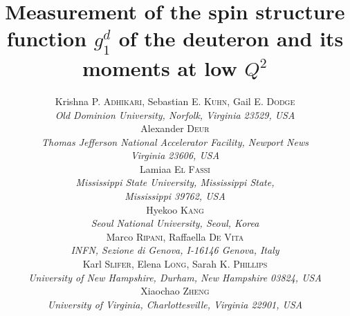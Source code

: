 \documentclass[a4paper,12pt,twoside,epsfig]{report}%
\begin{document}
\makeatother %


\title{Measurement of the spin structure function $g^d_{1}$ of the deuteron and its moments at low $Q^2$}
\begin{comment}
\author{Krishna P. Adhikari, Sebastian E. Kuhn, \\*
Alexander Deur, Lamiaa El Fassi, Hyekoo Kang, Sarah K. Phillips, \\* %
Marco Ripani, Karl Slifer, Raffaella De Vita, Gail E. Dodge, \\*
 Xiaochao Zheng}
\end{comment}

\author{
  Krishna \textsc{P. Adhikari}, Sebastian \textsc{E. Kuhn}, Gail \textsc{E. Dodge} \\
  {\it Old Dominion University, Norfolk, Virginia 23529, USA} \\
  Alexander \textsc{Deur} \\
  {\it Thomas Jefferson National Accelerator Facility, Newport News} \\
  {\it Virginia 23606, USA} \\
  Lamiaa \textsc{El Fassi} \\
  {\it Mississippi State University, Mississippi State,} \\
  {\it Mississippi 39762, USA} \\
  Hyekoo \textsc{Kang} \\
  {\it Seoul National University, Seoul, Korea} \\
  Marco \textsc{Ripani}, Raffaella \textsc{De Vita} \\
  {\it INFN, Sezione di Genova, I-16146 Genova, Italy} \\
  Karl \textsc{Slifer}, Elena \textsc{Long}, Sarah \textsc{K. Phillips} \\
  {\it University of New Hampshire, Durham, New Hampshire 03824, USA} \\
  Xiaochao \textsc{Zheng} \\
  {\it University of Virginia, Charlottesville, Virginia 22901, USA}   
}
 


\maketitle
\end{document}
